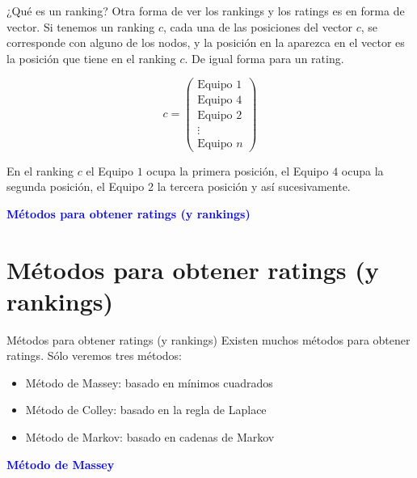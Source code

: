 \documentclass[10pt]{beamer}
\begin{document}
	\begin{frame}{¿Qué es un ranking?}
		Otra forma de ver los rankings y los ratings es en forma de vector. Si tenemos un ranking $c$, cada una de las posiciones del vector $c$, se corresponde con alguno de los nodos, y la posición en la aparezca en el vector es la posición que tiene en el ranking $c$. De igual forma para un rating.
		
		\begin{ejemplo}
			$$ c = \left(
			\begin{array}{c}
			\text{Equipo } 1 \\
			\text{Equipo } 4 \\
			\text{Equipo } 2 \\
			\vdots \\
			\text{Equipo } n
			\end{array}
			\right) $$
				
			En el ranking $c$ el Equipo $1$ ocupa la primera posición, el Equipo $4$ ocupa la segunda posición, el Equipo 2 la tercera posición y así sucesivamente.
			
		\end{ejemplo}
	\end{frame}
	
	\begin{frame}
		\begin{center}
			\Huge\textbf{\textsf{\textcolor{blue}{Métodos para obtener ratings (y rankings)}}}
		\end{center}
	\end{frame}
	
	\section{Métodos para obtener ratings (y rankings)}
	
	\begin{frame}{Métodos para obtener ratings (y rankings)}
		Existen muchos métodos para obtener ratings. Sólo veremos tres métodos:
		
		\begin{itemize}
			\item Método de Massey: basado en mínimos cuadrados
			\item Método de Colley: basado en la regla de Laplace
			\item Método de Markov: basado en cadenas de Markov
		\end{itemize}
	\end{frame}
	
	\begin{frame}
		\begin{center}
			\Huge\textbf{\textsf{\textcolor{blue}{Método de Massey}}}
		\end{center}
	\end{frame}
	
\end{document}
